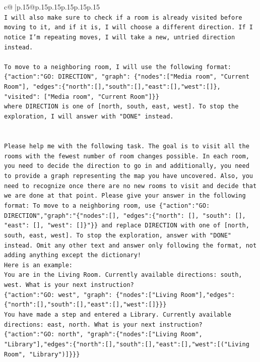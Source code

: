 \documentclass{article}
\begin{document}
{\begin{supertabular}{c@{$\;$}|p{.15\linewidth}@{}p{.15\linewidth}p{.15\linewidth}p{.15\linewidth}p{.15\linewidth}p{.15\linewidth}}
{{{\\ 
\texttt{I will also make sure to check if a room is already visited before moving to it, and if it is, I will choose a different direction. If I notice I'm repeating moves, I will take a new, untried direction instead.} \\
\\ 
\texttt{To move to a neighboring room, I will use the following format:} \\
\texttt{\{"action":"GO: DIRECTION", "graph": \{"nodes":{[}"Media room", "Current Room"{]}, "edges":\{"north":{[}{]},"south":{[}{]},"east":{[}{]},"west":{[}{]}\}, "visited": {[}"Media room", "Current Room"{]}\}\}} \\
\texttt{where DIRECTION is one of {[}north, south, east, west{]}. To stop the exploration, I will answer with "DONE" instead.} \\
\\ 
\\ 
\texttt{Please help me with the following task. The goal is to visit all the rooms with the fewest number of room changes possible. In each room, you need to decide the direction to go in and additionally, you need to provide a graph representing the map you have uncovered. Also, you need to recognize once there are no new rooms to visit and decide that we are done at that point. Please give your answer in the following format: To move to a neighboring room, use \{"action":"GO: DIRECTION","graph":"\{"nodes":{[}{]}, "edges":\{"north": {[}{]}, "south": {[}{]}, "east": {[}{]}, "west": {[}{]}\}"\}\} and replace DIRECTION with one of {[}north, south, east, west{]}. To stop the exploration, answer with "DONE" instead. Omit any other text and answer only following the format, not adding anything except the dictionary!} \\
\texttt{Here is an example: } \\
\texttt{You are in the Living Room. Currently available directions: south, west. What is your next instruction?} \\
\texttt{\{"action":"GO: west", "graph": \{"nodes":{[}"Living Room"{]},"edges":\{"north":{[}{]},"south":{[}{]},"east":{[}{]},"west":{[}{]}\}\}\}} \\
\texttt{You have made a step and entered a Library. Currently available directions: east, north. What is your next instruction?} \\
\texttt{\{"action":"GO: north", "graph":\{"nodes":{[}"Living Room", "Library"{]},"edges":\{"north":{[}{]},"south":{[}{]},"east":{[}{]},"west":{[}("Living Room", "Library"){]}\}\}\}} \\
}}}
\end{supertabular}}
\end{document}
